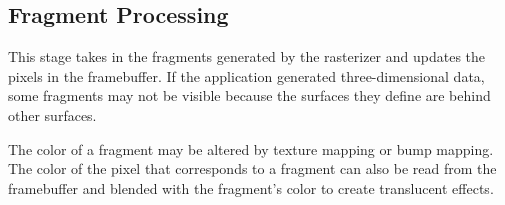 \documentclass[\main/notes.tex]{subfiles}
\begin{document}
			\subsection{Fragment Processing}
				This stage takes in the fragments generated by the rasterizer
				and updates the pixels in the framebuffer.
				If the application generated three-dimensional data,
				some fragments may not be visible
				because the surfaces they define are behind other surfaces.

				The color of a fragment may be altered by texture mapping or bump mapping.
				The color of the pixel that corresponds to a fragment
				can also be read from the framebuffer
				and blended with the fragment's color
				to create translucent effects.
\end{document}
